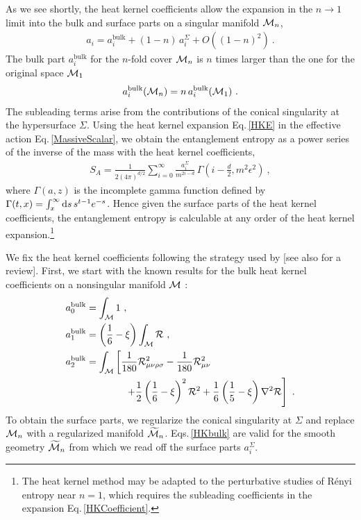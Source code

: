 As we see shortly, the heat kernel coefficients allow the expansion in the $n \to 1$ limit into the bulk and surface parts on a singular manifold ${\cal M}_n$,
\begin{align}\label{HKCoefficient}
a_i = a_i^\text{bulk} + (1-n) \,a_i^\Sigma + O\left( (1-n)^2\right)\ .
\end{align}
The bulk part $a_i^\text{bulk}$ for the $n$-fold cover ${\cal M}_n$ is $n$ times larger than the one for the original space ${\cal M}_1$
\begin{align}\label{BulkMn}
a_i^\text{bulk}({\cal M}_n) = n\, a_i^\text{bulk}({\cal M}_1) \ .
\end{align}
The subleading terms arise from the contributions of the conical singularity at the hypersurface $\Sigma$.
Using the heat kernel expansion Eq.\,\eqref{HKE} in the effective action Eq.\,\eqref{MassiveScalar}, we obtain the entanglement entropy as a power series of the inverse of the mass with the heat kernel coefficients,
\begin{align}\label{EE_Scalar_HK}
S_A = \frac{1}{2(4\pi)^{d/2}}\sum_{i=0}^\infty \frac{a_i^\Sigma}{m^{2i - d}} \,\Gamma\left( i - \frac{d}{2}, m^2 \epsilon^2\right) \ ,
\end{align}
where $\Gamma(a,z)$ is the incomplete gamma function defined by $\Gamma (t,x) = \int_x^\infty \mathrm{d} s\, s^{t-1} e^{-s}$.
Hence given the surface parts of the heat kernel coefficients, the entanglement entropy is calculable at any order of the heat kernel expansion.\footnote{The heat kernel method may be adapted to the perturbative studies of R{\'e}nyi entropy near $n=1$, which requires the subleading coefficients in the expansion Eq.\,\eqref{HKCoefficient}.}

We fix the heat kernel coefficients following the strategy used by \textcite{Fursaev:1994in,Fursaev:1995ef,Fursaev:2013fta} [see also \textcite{Solodukhin:2011gn} for a review].
First, we start with the known results for the bulk heat kernel coefficients on a nonsingular manifold ${\cal M}$ \cite{Birrell:1982ix,Vassilevich:2003xt}:
\begin{align}\label{HKbulk}
\begin{aligned}
a_0^\text{bulk} &= \int_{{\cal M}} 1\ , \\
	a_1^\text{bulk} &= \left( \frac{1}{6} - \xi \right) \int_{{\cal M}} {\cal R} \ , \\
	a_2^\text{bulk} &= \int_{{\cal M}} \left[ \frac{1}{180} {\cal R}_{\mu\nu\rho\sigma}^2 - \frac{1}{180} {\cal R}_{\mu\nu}^2 \right.\\
		&\qquad \qquad \left. + \frac{1}{2}
	 \left( \frac{1}{6} - \xi \right)^2 {\cal R}^2 + \frac{1}{6} \left( \frac{1}{5} - \xi \right)\nabla^2 {\cal R} \right]\ .
\end{aligned}
\end{align}
To obtain the surface parts, we regularize the conical singularity at $\Sigma$ and replace ${\cal M}_n$ with a regularized manifold $\widetilde {{\cal M}}_n$.
Eqs.\,\eqref{HKbulk} are valid for the smooth geometry $\widetilde {{\cal M}}_n$ from which we read off the surface parts $a_i^\Sigma$.



